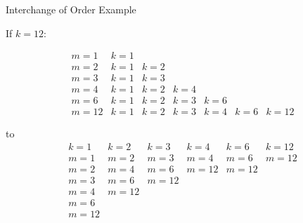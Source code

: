 \begin{frame}{Interchange of Order Example}

If $k=12$: 

$$
\begin{array}{r|llllll}
m=1 & k=1 & & & \\
m=2 & k=1 & k=2 & & & \\
m=3 & k=1 & k=3 & & & \\
m=4 & k=1 & k=2 & k=4 & & \\
m=6 & k=1 & k=2 & k=3 & k=6 & \\
m=12 & k=1 & k=2 & k=3 & k=4 & k=6 & k=12
\end{array}
$$

to 
$$
\begin{array}{rlllll}
k=1 & k=2 & k=3 & k=4 & k=6 & k=12 \\
\hline
m=1 & m=2 & m=3 & m=4 & m=6 & m=12 \\
m=2 & m=4 & m=6 & m=12 & m=12 & \\
m=3 & m=6 & m=12 & & & \\
m=4 & m=12 & & & & \\
m=6 & & & & & \\
m=12 &  & & & &
\end{array}
$$
    
\end{frame}

